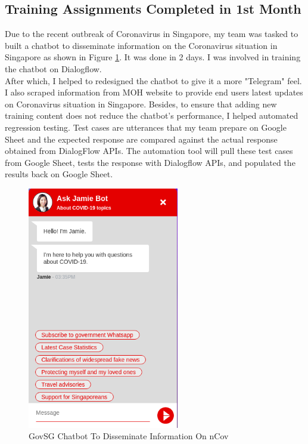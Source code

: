 \subsection{Training Assignments Completed in 1st Month}
Due to the recent outbreak of Coronavirus in Singapore, my team was tasked to built a chatbot to disseminate information on the Coronavirus situation in Singapore as shown in Figure \ref{fig:govsg-chatbot}. It was done in 2 days. I was involved in training the chatbot on Dialogflow.\\
\noindent
After which, I helped to redesigned the chatbot to give it a more "Telegram" feel. I also scraped information from MOH website to provide end users latest updates on Coronavirus situation in Singapore. Besides, to ensure that adding new training content does not reduce the chatbot's performance, I helped automated regression testing. Test cases are utterances that my team prepare on Google Sheet and the expected response are compared against the actual response obtained from DialogFlow APIs. The automation tool will pull these test cases from Google Sheet, tests the response with Dialogflow APIs, and populated the results back on Google Sheet.
\begin{figure}[h!]
	\begin{center}
		\includegraphics[width=250px]{assets/images/govsg-chatbot.png}
		\caption{GovSG Chatbot To Disseminate Information On nCov}
		\label{fig:govsg-chatbot}
	\end{center}
\end{figure}

